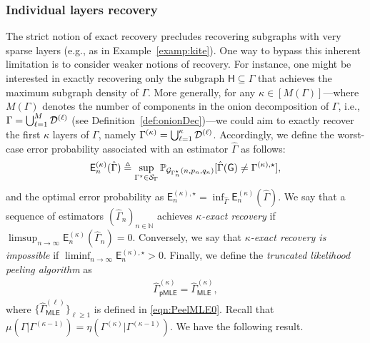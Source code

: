 \documentclass[12pt]{article}
\newcommand {\pr} {\mathbb{P}}
\newcommand{\calD}{{\cal D}}
\newcommand{\calS}{{\cal S}}
\newcommand{\s}[1]{\mathsf{#1}}
\begin{document}
\subsubsection{Individual layers recovery} 

The strict notion of exact recovery precludes recovering subgraphs with very sparse layers (e.g., as in Example~\ref{examp:kite}). One way to bypass this inherent limitation is to consider weaker notions of recovery. For instance, one might be interested in exactly recovering only the subgraph $\s{H} \subseteq \Gamma$ that achieves the maximum subgraph density of $\Gamma$. More generally, for any $\kappa \in [M(\Gamma)]$---where $M(\Gamma)$ denotes the number of components in the onion decomposition of $\Gamma$, i.e., $\Gamma = \bigcup_{\ell=1}^{M}\calD^{(\ell)}$ (see Definition~\ref{def:onionDec})---we could aim to exactly recover the first $\kappa$ layers of $\Gamma$, namely $\Gamma^{(\kappa)}= \bigcup_{\ell=1}^{\kappa}\calD^{(\ell)}$. Accordingly, we define the worst-case error probability associated with an estimator $\hat{\Gamma}$ as follows:
\begin{align}
    \s{E}_n^{(\kappa)}(\hat{\Gamma})\triangleq\sup_{\Gamma^\star\in\calS_\Gamma}\pr_{\mathcal{G}_{\Gamma_n^\star}(n,p_n,q_n)}[\hat{\Gamma}(\s{G})\neq\Gamma^{(\kappa),\star}],
\end{align}
and the optimal error probability as $\s{E}_n^{(\kappa),\star} = \inf_{\hat{\Gamma}}\s{E}_n^{(\kappa)}(\hat{\Gamma})$. We say that a sequence of estimators $(\hat{\Gamma}_n)_{n \in \mathbb{N}}$ achieves \emph{$\kappa$-exact recovery} if $\limsup_{n\to\infty}\s{E}_n^{(\kappa)}(\hat{\Gamma}_n)= 0$. Conversely, we say that \emph{$\kappa$-exact recovery is impossible} if $\liminf_{n \to \infty} \s{E}_n^{(\kappa),\star}>0$. Finally, we define the \emph{truncated likelihood peeling algorithm} as
\begin{align}
    \hat{\Gamma}^{(\kappa)}_{\s{pMLE}} = \hat{\Gamma}^{(\kappa)}_{\s{MLE}},\label{eqn:PeelMLEKappa}
\end{align}
where $\{\hat{\Gamma}^{(\ell)}_{\s{MLE}}\}_{\ell\geq1}$ is defined in \eqref{eqn:PeelMLE0}. Recall that $\mu(\Gamma\vert\Gamma^{(\kappa-1)})=\eta(\Gamma^{(\kappa)}\vert\Gamma^{(\kappa-1)})$. We have the following result.
\end{document}
